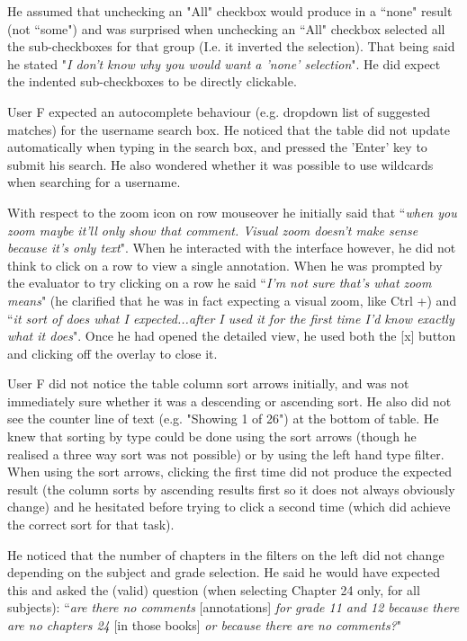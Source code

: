 He assumed that unchecking an "All" checkbox would produce in a ``none" result (not ``some") and was surprised when unchecking an ``All" checkbox selected all the sub-checkboxes for that group (I.e. it inverted the selection). That being said he stated "\textit{I don't know why you would want a 'none' selection}". He did expect the indented sub-checkboxes to be directly clickable.

User F expected an autocomplete behaviour (e.g. dropdown list of suggested matches) for the username search box. He noticed that the table did not update automatically when typing in the search box, and pressed the 'Enter' key to submit his search. He also wondered whether it was possible to use wildcards when searching for a username.

With respect to the zoom icon on row mouseover he initially said that ``\textit{when you zoom maybe it'll only show that comment. Visual zoom doesn't make sense because it's only text}". When he interacted with the interface however, he did not think to click on a row to view a single annotation.  When he was prompted by the evaluator to try clicking on a row he said ``\textit{I'm not sure that's what zoom means}" (he clarified that he was in fact expecting a visual zoom, like Ctrl +) and ``\textit{it sort of does what I expected...after I used it for the first time I'd know exactly what it does}". Once he had opened the detailed view, he used both the [x] button and clicking off the overlay to close it. 

User F did not notice the table column sort arrows initially, and was not immediately sure whether it was a descending or ascending sort. He also did not see the counter line of text (e.g. "Showing 1 of 26") at the bottom of table. He knew that sorting by type could be done using the sort arrows (though he realised a three way sort was not possible) or by using the left hand type filter. When using the sort arrows, clicking the first time did not produce the expected result (the column sorts by ascending results first so it does not always obviously change) and he hesitated before trying to click a second time (which did achieve the correct sort for that task).

He noticed that the number of chapters in the filters on the left did not change depending on the subject and grade selection. He said he would have expected this and asked the (valid) question (when selecting Chapter 24 only, for all subjects):  ``\textit{are there no comments} [annotations] \textit{for grade 11 and 12 because there are no chapters 24} [in those books] \textit{or because there are no comments?}"


